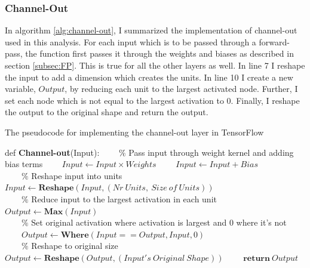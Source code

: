 \subsubsection*{Channel-Out}
In algorithm \ref{alg:channel-out}, I summarized the implementation of channel-out used in this analysis. For each 
input which is to be passed through a forward-pass, the function first passes it through the weights and biases 
as described in section \ref{subsec:FP}. This is true for all the other layers as well. In line 7 I reshape the input 
to add a dimension which creates the units. In line 10 I create a new variable, $Output$, by reducing each unit to the 
largest activated node. Further, I set each node which is not equal to the largest activation to 0. Finally, I reshape 
the output to the original shape and return the output.  
\begin{algorithm}
    \caption{The pseudocode for implementing the channel-out layer in TensorFlow}\label{alg:channel-out}
    \begin{algorithmic}[1]
    \State def \textbf{Channel-out}(Input): 
    \State \ \ \ \ $\%$ Pass input through weight kernel and adding bias terms
    \State \ \ \ \ $Input \gets Input \times Weights$
    \State \ \ \ \ $Input \gets Input + Bias$
    \\
    \State \ \ \ \ $\%$ Reshape input into units
    \State \ \ \ \ $Input \gets \textbf{Reshape}(Input,(Nr\ Units,\ Size \ of \ Units))$
    \\
    \State \ \ \ \ $\%$ Reduce input to the largest activation in each unit
    \State \ \ \ \ $Output \gets \textbf{Max}(Input)$
    \\
    \State \ \ \ \ $\%$ Set original activation where activation is largest and 0 where it's not
    \State \ \ \ \ $Output \gets \textbf{Where}(Input == Output, Input,0)$
    \\
    \State \ \ \ \ $\%$ Reshape to original size
    \State \ \ \ \ $Output \gets \textbf{Reshape}(Output,(Input's \ Original \ Shape))$
    \State \ \ \ \ $\textbf{return}\ Output$
    \end{algorithmic}
\end{algorithm}
